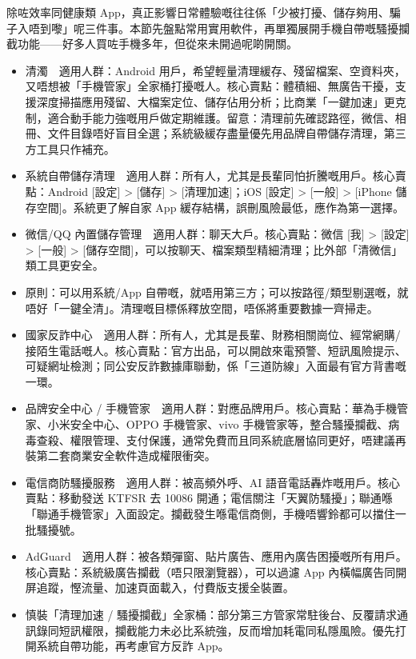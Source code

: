 
除咗效率同健康類 App，真正影響日常體驗嘅往往係「少被打擾、儲存夠用、騙子入唔到嚟」呢三件事。本節先盤點常用實用軟件，再單獨展開手機自帶嘅騷擾攔截功能——好多人買咗手機多年，但從來未開過呢啲開關。


\begin{itemize}
  \item 清濁　適用人群：Android 用戶，希望輕量清理緩存、殘留檔案、空資料夾，又唔想被「手機管家」全家桶打擾嘅人。核心賣點：體積細、無廣告干擾，支援深度掃描應用殘留、大檔案定位、儲存佔用分析；比商業「一鍵加速」更克制，適合動手能力強嘅用戶做定期維護。留意：清理前先確認路徑，微信、相冊、文件目錄唔好盲目全選；系統級緩存盡量優先用品牌自帶儲存清理，第三方工具只作補充。
  \item 系統自帶儲存清理　適用人群：所有人，尤其是長輩同怕折騰嘅用戶。核心賣點：Android [設定] > [儲存] > [清理加速]；iOS [設定] > [一般] > [iPhone 儲存空間]。系統更了解自家 App 緩存結構，誤刪風險最低，應作為第一選擇。
  \item 微信/QQ 內置儲存管理　適用人群：聊天大戶。核心賣點：微信 [我] > [設定] > [一般] > [儲存空間]，可以按聊天、檔案類型精細清理；比外部「清微信」類工具更安全。
  \item 原則：可以用系統/App 自帶嘅，就唔用第三方；可以按路徑/類型剔選嘅，就唔好「一鍵全清」。清理嘅目標係釋放空間，唔係將重要數據一齊掃走。
\end{itemize}


\begin{itemize}
  \item 國家反詐中心　適用人群：所有人，尤其是長輩、財務相關崗位、經常網購/接陌生電話嘅人。核心賣點：官方出品，可以開啟來電預警、短訊風險提示、可疑網址檢測；同公安反詐數據庫聯動，係「三道防線」入面最有官方背書嘅一環。
  \item 品牌安全中心 / 手機管家　適用人群：對應品牌用戶。核心賣點：華為手機管家、小米安全中心、OPPO 手機管家、vivo 手機管家等，整合騷擾攔截、病毒查殺、權限管理、支付保護，通常免費而且同系統底層協同更好，唔建議再裝第二套商業安全軟件造成權限衝突。
  \item 電信商防騷擾服務　適用人群：被高頻外呼、AI 語音電話轟炸嘅用戶。核心賣點：移動發送 KTFSR 去 10086 開通；電信關注「天翼防騷擾」；聯通喺「聯通手機管家」入面設定。攔截發生喺電信商側，手機唔響鈴都可以擋住一批騷擾號。
  \item AdGuard　適用人群：被各類彈窗、貼片廣告、應用內廣告困擾嘅所有用戶。核心賣點：系統級廣告攔截（唔只限瀏覽器），可以過濾 App 內橫幅廣告同開屏追蹤，慳流量、加速頁面載入，付費版支援全裝置。
  \item 慎裝「清理加速 / 騷擾攔截」全家桶：部分第三方管家常駐後台、反覆請求通訊錄同短訊權限，攔截能力未必比系統強，反而增加耗電同私隱風險。優先打開系統自帶功能，再考慮官方反詐 App。
\end{itemize}

